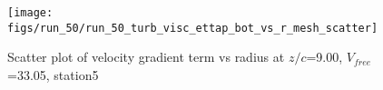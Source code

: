 \begin{figure}[H]
\centering
\texttt{[image: figs/run\_50/run\_50\_turb\_visc\_ettap\_bot\_vs\_r\_mesh\_scatter]}
\caption{Scatter plot of velocity gradient term vs radius at $z/c$=9.00, $V_{free}$=33.05, station5}
\label{fig:run_50_turb_visc_ettap_bot_vs_r_mesh_scatter}
\end{figure}


